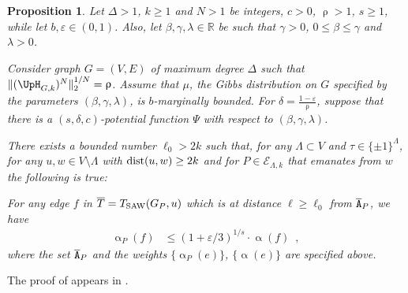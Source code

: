 \documentclass[11pt,reqno]{amsart}
\numberwithin{equation}{section}
\newtheorem{proposition}[theorem]{Proposition}
\newcommand{\cE}{{\mathcal{E}}}
\newcommand{\applegreen}[1]{ {\color{applegreen}#1}}
\newcommand{\blue}[1]{{\color{blue}#1}}
\newcommand{\bluepigment}[1]{{\color{blue(pigment)}#1}}
\newcommand{\cadmiumgreen}[1]{{\color{cadmiumgreen}#1}}
\newcommand{\darkmagenta}[1]{{\color{darkmagenta}#1}}
\newcommand{\deeppink}[1]{{\color{deeppink}#1}}
\newcommand{\goldenbrown}[1]{{\color{goldenbrown}#1}}
\newcommand{\iris}[1]{{\color{iris}#1}}
\newcommand{\red}[1]{{\color{red}#1}}
\newcommand{\dist}{{\rm dist}}
\newcommand{\maxDeg}{{\Delta}}
\newcommand{\ExtV}{\iris{\cE}}
\newcommand{\potF}{{\Psi}}
\newcommand{\pfs}{\darkmagenta{s}}
\newcommand{\Tsaw}{T_{\rm SAW}}
\newcommand{\nnorm}[3]{\goldenbrown{\|} #1\goldenbrown{\|}^{#2}_{#3}}
\newcommand{\NBMatrix}{\cadmiumgreen{\UpH}_{G,\kk}}
\renewcommand{\applegreen}[1]{#1}
\renewcommand{\blue}[1]{#1}
\renewcommand{\bluepigment}[1]{#1}
\renewcommand{\cadmiumgreen}[1]{#1}
\renewcommand{\darkmagenta}[1]{#1}
\renewcommand{\deeppink}[1]{#1}
\renewcommand{\goldenbrown}[1]{#1}
\renewcommand{\iris}[1]{#1}
\renewcommand{\red}[1]{#1}
\newcommand{\ke}{\blue{e}}
\newcommand{\kf}{\deeppink{f}}
\newcommand{\kk}{\bluepigment{k}}
\newcommand{\kell}{{\color{green(pigment)}\ell}}%
\newcommand{\kP}{\goldenbrown{P}}
\newcommand{\ku}{\red{u}}
\newcommand{\kw}{\blue{w}}
\renewcommand{\ke}{e}
\renewcommand{\kf}{f}
\renewcommand{\kk}{k}
\renewcommand{\kell}{\ell}
\renewcommand{\kP}{P}
\renewcommand{\ku}{u}
\renewcommand{\kw}{w}
\newcommand{\infweight}{\upalpha}
\newcommand{\SingBound}{\uprho}
\begin{document}
\begin{proposition}\label{prop:StableSSM}
Let $\maxDeg > 1$, $\kk\geq 1$ and $N>1$ be integers, $c>0$, $\SingBound> 1$, $\pfs \geq 1$, while 
let $b,\varepsilon\in (0,1)$. Also, let $\beta,\gamma, \lambda\in \mathbb{R}$ be such that $\gamma >0$,
$0\leq \beta\leq \gamma$ and $\lambda>0$. 
%

Consider graph $G=(V,E)$ of maximum degree $\maxDeg$ such that 
$\nnorm{ (\NBMatrix)^N}{1/N}{2}= \SingBound$.
%
Assume that $\mu$, the Gibbs distribution on $G$ specified by the parameters $(\beta, \gamma, \lambda)$,
is $b$-marginally bounded.
%
For $\delta= \frac{1-\varepsilon}{\SingBound}$, suppose that there
is a $(\pfs,\delta,c)$-potential function $\potF$ with respect to $(\beta,\gamma,\lambda)$. 

There exists a bounded number $\ell_0>2\kk$ such that, 
for any $\Lambda\subset V$ and $\tau\in \{\pm 1\}^{\Lambda}$,
for any $\ku,\kw\in V\setminus \Lambda$ with $\dist(\ku,\kw)\geq 2\kk$ and for $\kP\in \ExtV_{\Lambda,\kk}$ 
that emanates from  $\kw$  the following is true:


For any edge $\kf$ in $\SMTPu=\Tsaw(\gext{G}{\kP}, \ku)$ which is at distance $\kell\geq \ell_0$ from $\cpTP$, we have 
\begin{align}\label{eq:prop:StableSSM}
\infweight_{\kP}(\kf)&\leq (1+\varepsilon/3)^{1/\pfs} \cdot \infweight(\kf) \enspace, 
\end{align}
where the set $\cpTP$ and the weights $\{ \infweight_{\kP}(\ke)\}$, $\{\infweight(\ke)\}$ are specified above.
\end{proposition}
%
The proof of  appears in .
\end{document}
